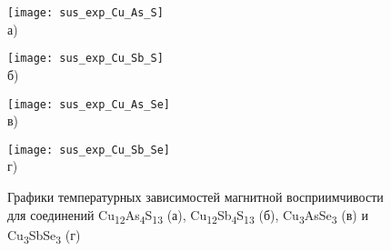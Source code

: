 \begin{figure}[ht]
  \begin{minipage}[ht]{0.5\linewidth}\centering
    \texttt{[image: sus\_exp\_Cu\_As\_S]} \\ а)
  \end{minipage}
  \hfill
  \begin{minipage}[ht]{0.5\linewidth}\centering
    \texttt{[image: sus\_exp\_Cu\_Sb\_S]} \\ б)
  \end{minipage}
\vfill
  \begin{minipage}[ht]{0.5\linewidth}\centering
    \texttt{[image: sus\_exp\_Cu\_As\_Se]} \\ в)
  \end{minipage}
  \hfill
  \begin{minipage}[ht]{0.5\linewidth}\centering
    \texttt{[image: sus\_exp\_Cu\_Sb\_Se]} \\ г)
  \end{minipage}

      \caption[Графики температурных зависимостей магнитной восприимчивости для соединений Cu\textsubscript{12}As\textsubscript{4}S\textsubscript{13} (а), Cu\textsubscript{12}Sb\textsubscript{4}S\textsubscript{13} (б), Cu\textsubscript{3}AsSe\textsubscript{3} (в) и Cu\textsubscript{3}SbSe\textsubscript{3} (г)]{Графики температурных зависимостей магнитной восприимчивости для соединений Cu\textsubscript{12}As\textsubscript{4}S\textsubscript{13} (а), Cu\textsubscript{12}Sb\textsubscript{4}S\textsubscript{13} (б), Cu\textsubscript{3}AsSe\textsubscript{3} (в) и Cu\textsubscript{3}SbSe\textsubscript{3} (г)}
    \label{img:figure3}
\end{figure}






